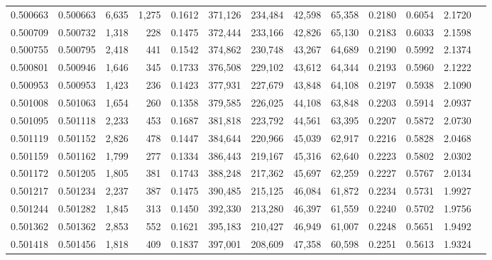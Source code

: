 \begin{tabular}{rrrrrrrrrrrrr}
0.500663 & 0.500663 &  6,635 & 1,275 &                                     0.1612 & 371,126 & 234,484 &  42,598 &  65,358 & 0.2180 & 0.6054 & 2.1720 \\
0.500709 & 0.500732 &  1,318 &   228 &                                     0.1475 & 372,444 & 233,166 &  42,826 &  65,130 & 0.2183 & 0.6033 & 2.1598 \\
0.500755 & 0.500795 &  2,418 &   441 &                                     0.1542 & 374,862 & 230,748 &  43,267 &  64,689 & 0.2190 & 0.5992 & 2.1374 \\
0.500801 & 0.500946 &  1,646 &   345 &                                     0.1733 & 376,508 & 229,102 &  43,612 &  64,344 & 0.2193 & 0.5960 & 2.1222 \\
0.500953 & 0.500953 &  1,423 &   236 &                                     0.1423 & 377,931 & 227,679 &  43,848 &  64,108 & 0.2197 & 0.5938 & 2.1090 \\
0.501008 & 0.501063 &  1,654 &   260 &                                     0.1358 & 379,585 & 226,025 &  44,108 &  63,848 & 0.2203 & 0.5914 & 2.0937 \\
0.501095 & 0.501118 &  2,233 &   453 &                                     0.1687 & 381,818 & 223,792 &  44,561 &  63,395 & 0.2207 & 0.5872 & 2.0730 \\
0.501119 & 0.501152 &  2,826 &   478 &                                     0.1447 & 384,644 & 220,966 &  45,039 &  62,917 & 0.2216 & 0.5828 & 2.0468 \\
0.501159 & 0.501162 &  1,799 &   277 &                                     0.1334 & 386,443 & 219,167 &  45,316 &  62,640 & 0.2223 & 0.5802 & 2.0302 \\
0.501172 & 0.501205 &  1,805 &   381 &                                     0.1743 & 388,248 & 217,362 &  45,697 &  62,259 & 0.2227 & 0.5767 & 2.0134 \\
0.501217 & 0.501234 &  2,237 &   387 &                                     0.1475 & 390,485 & 215,125 &  46,084 &  61,872 & 0.2234 & 0.5731 & 1.9927 \\
0.501244 & 0.501282 &  1,845 &   313 &                                     0.1450 & 392,330 & 213,280 &  46,397 &  61,559 & 0.2240 & 0.5702 & 1.9756 \\
0.501362 & 0.501362 &  2,853 &   552 &                                     0.1621 & 395,183 & 210,427 &  46,949 &  61,007 & 0.2248 & 0.5651 & 1.9492 \\
0.501418 & 0.501456 &  1,818 &   409 &                                     0.1837 & 397,001 & 208,609 &  47,358 &  60,598 & 0.2251 & 0.5613 & 1.9324 \\

\end{tabular}
